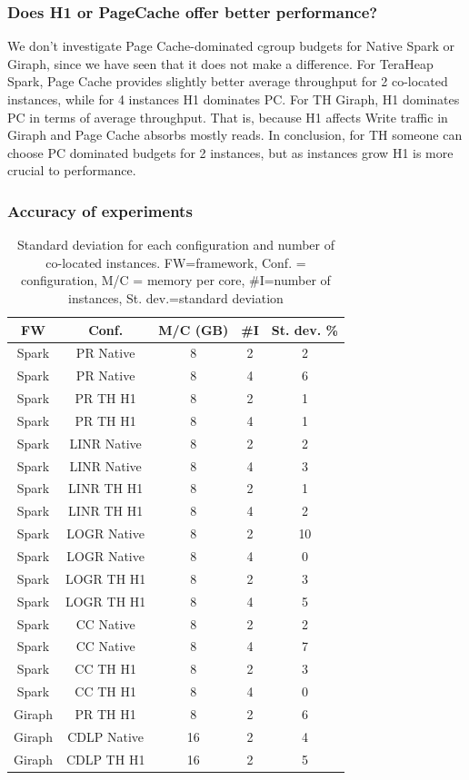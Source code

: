 \subsubsection{Does H1 or PageCache offer better performance?}
We don't investigate Page Cache-dominated cgroup budgets for Native Spark or Giraph, since we have seen that it does not make a difference. For TeraHeap Spark, Page Cache provides slightly better average throughput for 2 co-located instances, while for 4 instances H1 dominates PC. For TH Giraph, H1 dominates PC in terms of average throughput. That is, because H1 affects Write traffic in Giraph and Page Cache absorbs mostly reads. In conclusion, for TH someone can choose PC dominated budgets for 2 instances, but as instances grow H1 is more crucial to performance.

\subsubsection{Accuracy of experiments}

\begin{table}[thbp]
  \centering
  \caption{Standard deviation for each configuration and number of co-located instances.
        FW=framework, Conf. = configuration, M/C = memory per core, #I=number of instances, St. dev.=standard deviation}
  \label{tab:std-dev}
  \begin{tabular}{|c|c|c|c|c|}
    \hline
          \textbf{FW} & \textbf{Conf.} & \textbf{M/C (GB)} & \textbf{\#I} & \textbf{St. dev. \%} \\
    \hline
          Spark & PR Native & 8 & 2 & 2\\
          Spark & PR Native & 8 & 4 & 6\\
          Spark & PR TH H1 & 8 & 2 & 1 \\
          Spark & PR TH H1 & 8 & 4 & 1 \\
          Spark & LINR Native & 8 & 2 & 2 \\
          Spark & LINR Native & 8 & 4 & 3 \\
          Spark & LINR TH H1 & 8 & 2 & 1 \\
          Spark & LINR TH H1 & 8 & 4 & 2 \\
          Spark & LOGR Native & 8 & 2 & 10 \\
          Spark & LOGR Native & 8 & 4 & 0 \\
          Spark & LOGR TH H1 & 8 & 2 & 3 \\
          Spark & LOGR TH H1 & 8 & 4 & 5 \\
          Spark & CC Native & 8 & 2 & 2 \\
          Spark & CC Native & 8 & 4 & 7 \\
          Spark & CC TH H1 & 8 & 2 & 3 \\
          Spark & CC TH H1 & 8 & 4 & 0 \\
          Giraph & PR TH H1 & 8 & 2 & 6 \\
          Giraph & CDLP Native & 16 & 2 & 4 \\
          Giraph & CDLP TH H1 & 16 & 2 & 5 \\
    \hline
  \end{tabular}
\end{table}

